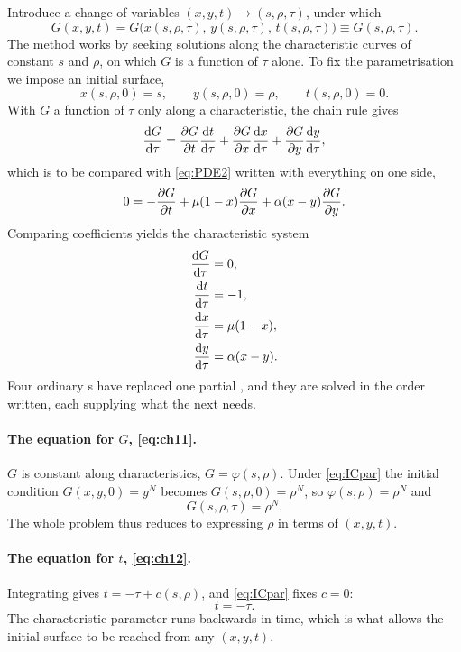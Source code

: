 Introduce a change of variables $(x,y,t)\to(s,\rho,\tau)$, under which
\begin{equation*}
G(x,y,t) = G\bigl(x(s,\rho,\tau),\,y(s,\rho,\tau),\,t(s,\rho,\tau)\bigr) \equiv G(s,\rho,\tau).
\end{equation*}
The method works by seeking solutions along the characteristic curves of constant $s$ and
$\rho$, on which $G$ is a function of $\tau$ alone. To fix the parametrisation we impose an
initial surface,
\begin{equation}
\label{eq:ICpar}
x(s,\rho,0) = s, \qquad y(s,\rho,0) = \rho, \qquad t(s,\rho,0) = 0 .
\end{equation}
With $G$ a function of $\tau$ only along a characteristic, the chain rule gives
\begin{equation*}
\displaystyle\frac{{\rm d} G}{{\rm d} \tau} = \displaystyle\frac{\partial G}{\partial t}\displaystyle\frac{{\rm d} t}{{\rm d} \tau} + \displaystyle\frac{\partial G}{\partial x}\displaystyle\frac{{\rm d} x}{{\rm d} \tau} + \displaystyle\frac{\partial G}{\partial y}\displaystyle\frac{{\rm d} y}{{\rm d} \tau},
\end{equation*}
which is to be compared with \cref{eq:PDE2} written with everything on one side,
\begin{equation*}
0 = -\displaystyle\frac{\partial G}{\partial t} + \mu(1-x)\displaystyle\frac{\partial G}{\partial x} + \alpha(x-y)\displaystyle\frac{\partial G}{\partial y} .
\end{equation*}
Comparing coefficients yields the characteristic system
\begin{align}
\displaystyle\frac{{\rm d} G}{{\rm d} \tau} &= 0, \label{eq:ch11}\\
\displaystyle\frac{{\rm d} t}{{\rm d} \tau} &= -1, \label{eq:ch12}\\
\displaystyle\frac{{\rm d} x}{{\rm d} \tau} &= \mu(1-x), \label{eq:ch13}\\
\displaystyle\frac{{\rm d} y}{{\rm d} \tau} &= \alpha(x-y). \label{eq:ch14}
\end{align}
Four ordinary \de s have replaced one partial \de{}, and they are solved in the order
written, each supplying what the next needs.

\paragraph{The equation for $G$, \cref{eq:ch11}.}
$G$ is constant along characteristics, $G=\varphi(s,\rho)$. Under \cref{eq:ICpar} the
initial condition $G(x,y,0)=y^N$ becomes $G(s,\rho,0)=\rho^N$, so $\varphi(s,\rho)=\rho^N$
and
\begin{equation}
\label{eq:GrN}
G(s,\rho,\tau) = \rho^N .
\end{equation}
The whole problem thus reduces to expressing $\rho$ in terms of $(x,y,t)$.

\paragraph{The equation for $t$, \cref{eq:ch12}.}
Integrating gives $t = -\tau + c(s,\rho)$, and \cref{eq:ICpar} fixes $c=0$:
\begin{equation}
\label{eq:minustau}
t = -\tau .
\end{equation}
The characteristic parameter runs backwards in time, which is what allows the initial
surface to be reached from any $(x,y,t)$.

